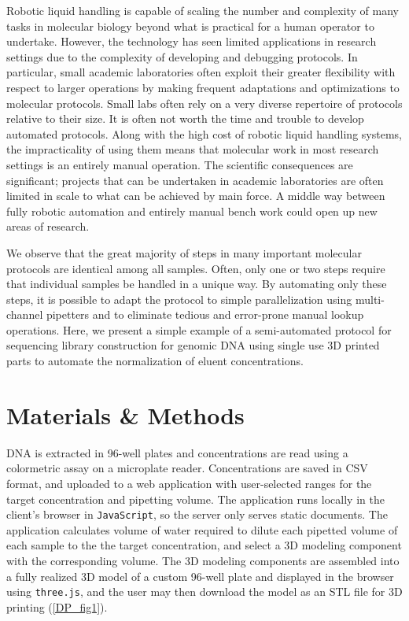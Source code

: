 \begin{refsection}
Robotic liquid handling is capable of scaling the number and complexity of many tasks in molecular biology beyond what is practical for a human operator to undertake. However, the technology has seen limited applications in research settings due to the complexity of developing and debugging protocols. In particular, small academic laboratories often exploit their greater flexibility with respect to larger operations by making frequent adaptations and optimizations to molecular protocols. Small labs often rely on a very diverse repertoire of protocols relative to their size. It is often not worth the time and trouble to develop automated protocols. Along with the high cost of robotic liquid handling systems, the impracticality of using them means that molecular work in most research settings is an entirely manual operation. The scientific consequences are significant; projects that can be undertaken in academic laboratories are often limited in scale to what can be achieved by main force. A middle way between fully robotic automation and entirely manual bench work could open up new areas of research.

We observe that the great majority of steps in many important molecular protocols are identical among all samples. Often, only one or two steps require that individual samples be handled in a unique way. By automating only these steps, it is possible to adapt the protocol to simple parallelization using multi-channel pipetters and to eliminate tedious and error-prone manual lookup operations. Here, we present a simple example of a semi-automated protocol for sequencing library construction for genomic DNA using single use 3D printed parts to automate the normalization of eluent concentrations.

\section{Materials \& Methods}

DNA is extracted in 96-well plates and concentrations are read using a colormetric assay on a microplate reader. Concentrations are saved in CSV format, and uploaded to a web application with user-selected ranges for the target concentration and pipetting volume. The application runs locally in the client's browser in {\tt JavaScript}, so the server only serves static documents. The application calculates volume of water required to dilute each pipetted volume of each sample to the the target concentration, and select a 3D modeling component with the corresponding volume. The 3D modeling components are assembled into a fully realized 3D model of a custom 96-well plate and displayed in the browser using {\tt three.js}, \cite{cabello2010three} and the user may then download the model as an STL file for 3D printing (\ref{DP_fig1}). 


\end{refsection}
